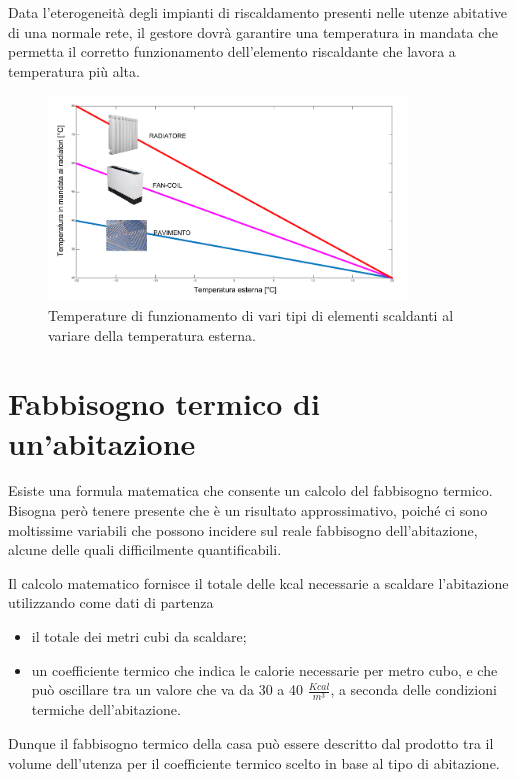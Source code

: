\documentclass[laurea,oneside,11pt]{USiena_tesiLM3}
\begin{document}
Data l'eterogeneità degli impianti di riscaldamento presenti nelle utenze abitative di una normale rete, il gestore dovrà garantire una temperatura in mandata che permetta il corretto funzionamento dell'elemento riscaldante che lavora a temperatura più alta.

\begin{figure}[!ht]
\centering
\includegraphics[width=0.85\textwidth]{figure/elem_scaldanti} 
\caption{Temperature di funzionamento di vari tipi di elementi scaldanti al variare della temperatura esterna.}
\label{fig:elem_scaldanti}
\end{figure}

\section{Fabbisogno termico di un'abitazione}
Esiste una formula matematica che consente un calcolo del fabbisogno termico. Bisogna però tenere presente che è  un risultato approssimativo, poiché ci sono moltissime variabili che possono incidere sul reale fabbisogno dell'abitazione, alcune delle quali difficilmente quantificabili. 

Il calcolo matematico fornisce il totale delle kcal necessarie a scaldare l'abitazione utilizzando come dati di partenza
\begin{itemize}
\item  il totale dei metri cubi da scaldare;
\item  un coefficiente termico che indica le calorie necessarie per metro cubo, e che può  oscillare tra un valore che va da 30 a 40 $\frac{Kcal}{m^3}$, a seconda delle condizioni termiche dell'abitazione.
\end{itemize}
Dunque il fabbisogno termico della casa può essere descritto dal prodotto tra il volume dell'utenza per il coefficiente termico scelto in base al tipo di abitazione.
\end{document}
